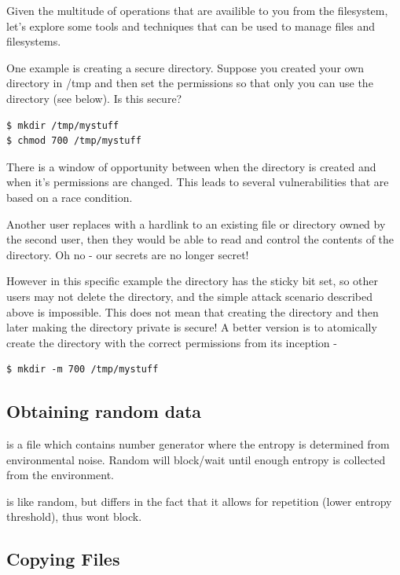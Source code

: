 Given the multitude of operations that are availible to you from the filesystem, let's explore some tools and techniques that can be used to manage files and filesystems.

One example is creating a secure directory. Suppose you created your own directory in /tmp and then set the permissions so that only you can use the directory (see below). Is this secure?

\begin{lstlisting}
$ mkdir /tmp/mystuff
$ chmod 700 /tmp/mystuff
\end{lstlisting}

There is a window of opportunity between when the directory is created and when it's permissions are changed. This leads to several vulnerabilities that are based on a race condition.

Another user replaces  with a hardlink to an existing file or directory owned by the second user, then they would be able to read and control the contents of the  directory. Oh no - our secrets are no longer secret!

However in this specific example the  directory has the sticky bit set, so other users may not delete the  directory, and the simple attack scenario described above is impossible. This does not mean that creating the directory and then later making the directory private is secure! A better version is to atomically create the directory with the correct permissions from its inception -

\begin{lstlisting}
$ mkdir -m 700 /tmp/mystuff
\end{lstlisting}

\subsection{Obtaining random data}

 is a file which contains number generator where the entropy is determined from environmental noise. Random will block/wait until enough entropy is collected from the environment.

 is like random, but differs in the fact that it allows for repetition (lower entropy threshold), thus wont block.


\subsection{Copying Files}


